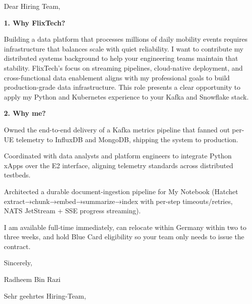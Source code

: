 \documentclass[11pt,a4paper]{coverletter}
\begin{document}

\opening{Dear Hiring Team,}

\vspace{8pt}\noindent\textbf{1. Why FlixTech?}\par\vspace{3pt}

Building a data platform that processes millions of daily mobility events requires infrastructure that balances scale with quiet reliability. I want to contribute my distributed systems background to help your engineering teams maintain that stability. FlixTech’s focus on streaming pipelines, cloud-native deployment, and cross-functional data enablement aligns with my professional goals to build production-grade data infrastructure. This role presents a clear opportunity to apply my Python and Kubernetes experience to your Kafka and Snowflake stack.

\vspace{8pt}\noindent\textbf{2. Why me?}\par\vspace{3pt}

\bullets

  \item Owned the end-to-end delivery of a Kafka metrics pipeline that fanned out per-UE telemetry to InfluxDB and MongoDB, shipping the system to production.

  \item Coordinated with data analysts and platform engineers to integrate Python xApps over the E2 interface, aligning telemetry standards across distributed testbeds.

  \item Architected a durable document-ingestion pipeline for My Notebook (Hatchet extract→chunk→embed→summarize→index with per-step timeouts/retries, NATS JetStream + SSE progress streaming).

\bulletsend

I am available full-time immediately, can relocate within Germany within two to three weeks, and hold Blue Card eligibility so your team only needs to issue the contract.

\closing{Sincerely,}{Radheem Bin Razi}

\clearpage
{}


\opening{Sehr geehrtes Hiring-Team,}
\end{document}
